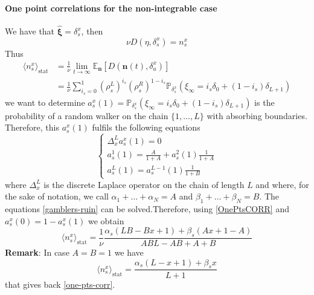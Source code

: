 \documentclass[11pt]{article}
\numberwithin{equation}{section}
\numberwithin{equation}{subsection}
\begin{document}
\paragraph{One point correlations for the non-integrable case}
We have that $\widehat{\bm{\xi}}=\delta_{s}^{x}$, then 
\begin{equation}
	\nu D(\eta,\delta_{s}^{x})=n_{s}^{x}
\end{equation}
Thus
\begin{equation}\label{OnePtsCORR}
	\begin{split}
		\langle n_{s}^{x}\rangle_{\text{stat}}&=\frac{1}{\nu}\lim_{t\to\infty}\mathbb{E}_{\bm{n}}\left[D(\bm{n}(t),\delta_{a}^{x})\right]\\&=\frac{1}{\nu}\sum_{i_{s}=0}^{1}\left(\rho_{s}^{L}\right)^{i_{s}}\left(\rho_{s}^{R}\right)^{1-i_{s}}\mathbb{P}_{\delta_{s}^{x}}\left(\xi_{\infty}=i_{s}\delta_{0}+(1-i_{s})\delta_{L+1}\right)
	\end{split}
\end{equation}
we want to determine $a^{x}_{s}(1)=\mathbb{P}_{\delta_{s}^{x}}\left(\xi_{\infty}=i_{s}\delta_{0}+(1-i_{s})\delta_{L+1}\right)$ is the probability of a random walker on the chain $\{1,\ldots,L\}$ with absorbing boundaries. Therefore, this $a_{s}^{x}(1)$ fulfils the following equations 
\begin{equation}\label{gamblers-ruin}
	\begin{cases}
		\Delta_{x}^{L}a^{x}_{s}(1)=0\\
		a^{1}_{s}(1)=\frac{A}{1+A}+a^{2}_{s}(1)\frac{1}{1+A}\\
		a^{L}_{s}(1)=a^{L-1}_{s}(1)\frac{1}{1+B}
	\end{cases}
\end{equation}
where $\Delta_{x}^{L}$ is the discrete Laplace operator on the chain of length $L$ and where, for the sake of notation, we call $\alpha_{1}+\ldots+\alpha_{N}=A$ and $\beta_{1}+\ldots+\beta_{N}=B$. The equations \eqref{gamblers-ruin} can be solved.Therefore, using \eqref{OnePtsCORR} and $a^{x}_{s}(0)=1-a^{x}_{s}(1)$ we obtain 
\begin{equation}
	\langle n_{s}^{x}\rangle_{\text{stat}}=\frac{1}{\nu}\frac{\alpha_{s}(LB-Bx+1)+\beta_{s}(Ax+1-A)}{ABL-AB+A+B}
\end{equation}
\textbf{Remark}: In case $A=B=1$ we have 
\begin{equation}
	\langle n_{s}^{x}\rangle_{\text{stat}}=\frac{\alpha_{s}(L-x+1)+\beta_{s}x}{L+1}
\end{equation}
that gives back \eqref{one-pts-corr}.
\end{document}
